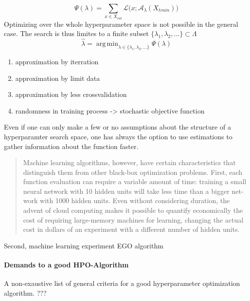 \documentclass[english]{article}
\DeclareMathOperator*{\argmin}{arg\,min}
\begin{document}
\begin{equation}
  \Psi(\lambda) = \sum_{x \in X_{val}} \mathcal{L}\big(x;\mathcal{A}_\lambda(X_{train})\big)
\end{equation}
Optimizing over the whole hyperparameter space is not possible in the general case. The search is thus limites to a finite subset $\{\lambda_1, \lambda_2, ... \} \subset \Lambda$
\begin{equation}
  \hat{\lambda} = \argmin_{\lambda \in \{\lambda_1, \lambda_2, ... \}} \Psi(\lambda)
\label{empirical hypa_opt_1}
\end{equation}


\begin{enumerate}
  \item approximation by iterration
  \item approximation by limit data
  \item approximation by less crossvalidation
  \item randomness in training process -> stochastic objective function
\end{enumerate}

Even if one can only make a few or no assumptions about the structure of a hyperparamter search space, one has always the option to use estimations to gather information about the function faster.


\begin{quote}
Machine learning algorithms, however, have certain characteristics that distinguish them from other black-box optimization problems.  First, each function evaluation can require a variable amount of time:  training a small neural network with 10 hidden units will take less time than a bigger net-work with 1000 hidden units.  Even without considering duration, the advent of cloud computing makes it possible to quantify economically the cost of requiring large-memory machines for learning, changing the actual cost in dollars of an experiment with a different number of hidden units.
\end{quote}
Second, machine learning experiment EGO algorithm


\paragraph{Demands to a good HPO-Algorithm}
A non-exaustive list of general criteria for a good hyperparameter optimization algorithm. ???
\end{document}
